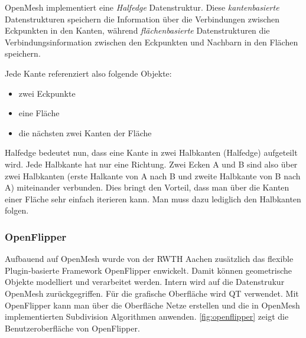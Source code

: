 OpenMesh implementiert eine \emph{Halfedge} Datenstruktur.
Diese \emph{kantenbasierte} Datenstrukturen speichern die Information über die Verbindungen zwischen Eckpunkten in den Kanten, während
\emph{flächenbasierte} Datenstrukturen die Verbindungsinformation zwischen den Eckpunkten und Nachbarn in den Flächen speichern.

Jede Kante referenziert also folgende Objekte:

\begin{itemize}
	\item zwei Eckpunkte
	\item eine Fläche
	\item die nächsten zwei Kanten der Fläche
\end{itemize}

Halfedge bedeutet nun, dass eine Kante in zwei Halbkanten (Halfedge) aufgeteilt wird. 
Jede Halbkante hat nur eine Richtung.
Zwei Ecken A und B sind also über zwei Halbkanten (erste Halkante von A nach B und zweite Halbkante von B nach A) miteinander verbunden.
Dies bringt den Vorteil, dass man über die Kanten einer Fläche sehr einfach iterieren kann. Man muss dazu lediglich den Halbkanten folgen.


\subsubsection{OpenFlipper}

Aufbauend auf OpenMesh wurde von der RWTH Aachen zusätzlich das flexible Plugin-basierte Framework OpenFlipper enwickelt.
Damit können geometrische Objekte modelliert und verarbeitet werden. Intern wird auf die Datenstrukur OpenMesh zurückgegriffen.
Für die grafische Oberfläche wird QT verwendet.
Mit OpenFlipper kann man über die Oberfläche Netze erstellen und die in OpenMesh implementierten Subdivision Algorithmen anwenden.
\autoref{fig:openflipper} zeigt die Benutzeroberfläche von OpenFlipper.

